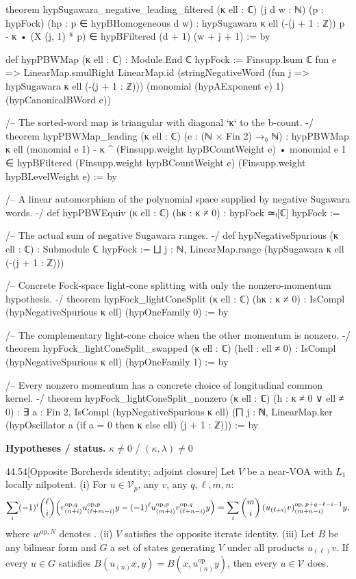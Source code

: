 \documentclass[11pt,openany]{book}
\theoremstyle{definition}
\theoremstyle{plain}
\begin{document}
\begin{leancode}
theorem hypSugawara_negative_leading_filtered (κ ell : ℂ) (j d w : ℕ)
    (p : hypFock) (hp : p ∈ hypBHomogeneous d w) :
    hypSugawara κ ell (-(j + 1 : ℤ)) p - κ • (X (j, 1) * p) ∈
      hypBFiltered (d + 1) (w + j + 1) := by

def hypPBWMap (κ ell : ℂ) : Module.End ℂ hypFock :=
  Finsupp.lsum ℂ fun e => LinearMap.smulRight LinearMap.id
    (stringNegativeWord (fun j => hypSugawara κ ell (-(j + 1 : ℤ)))
      (monomial (hypAExponent e) 1) (hypCanonicalBWord e))

/-- The sorted-word map is triangular with diagonal `κ` to the b-count. -/
theorem hypPBWMap_leading (κ ell : ℂ) (e : (ℕ × Fin 2) →₀ ℕ) :
    hypPBWMap κ ell (monomial e 1) -
      κ ^ (Finsupp.weight hypBCountWeight e) • monomial e 1 ∈
      hypBFiltered (Finsupp.weight hypBCountWeight e) (Finsupp.weight hypBLevelWeight e) := by

/-- A linear automorphism of the polynomial space supplied by negative Sugawara words. -/
def hypPBWEquiv (κ ell : ℂ) (hκ : κ ≠ 0) : hypFock ≃ₗ[ℂ] hypFock :=

/-- The actual sum of negative Sugawara ranges. -/
def hypNegativeSpurious (κ ell : ℂ) : Submodule ℂ hypFock :=
  ⨆ j : ℕ, LinearMap.range (hypSugawara κ ell (-(j + 1 : ℤ)))

/-- Concrete Fock-space light-cone splitting with only the nonzero-momentum hypothesis. -/
theorem hypFock_lightConeSplit (κ ell : ℂ) (hκ : κ ≠ 0) :
    IsCompl (hypNegativeSpurious κ ell) (hypOneFamily 0) := by

/-- The complementary light-cone choice when the other momentum is nonzero. -/
theorem hypFock_lightConeSplit_swapped (κ ell : ℂ) (hell : ell ≠ 0) :
    IsCompl (hypNegativeSpurious κ ell) (hypOneFamily 1) := by

/-- Every nonzero momentum has a concrete choice of longitudinal common kernel. -/
theorem hypFock_lightConeSplit_nonzero (κ ell : ℂ) (h : κ ≠ 0 ∨ ell ≠ 0) :
    ∃ a : Fin 2, IsCompl (hypNegativeSpurious κ ell)
      (⨅ j : ℕ, LinearMap.ker (hypOscillator a (if a = 0 then κ else ell) (j + 1 : ℤ))) := by
\end{leancode}
\noindent\textbf{Hypotheses / status.} $\kappa\ne0$ / $(\kappa,\lambda)\ne0$\par
\medskip
\begin{btheorem}{44.54}[Opposite Borcherds identity; adjoint closure]
Let $V$ be a near-VOA with $L_1$ locally nilpotent.  (i) For $u\in\mathcal V_p$, any $v$, any $q,\ell,m,n$:
\begin{multline*}
\sum_i(-1)^i\binom\ell i\Bigl(v^{\mathrm{op},q}_{(n+i)}u^{\mathrm{op},p}_{(\ell+m-i)}y-(-1)^\ell u^{\mathrm{op},p}_{(m+i)}v^{\mathrm{op},q}_{(\ell+n-i)}y\Bigr)
=\sum_i\binom mi\,(u_{(\ell+i)}v)^{\mathrm{op},\,p+q-\ell-i-1}_{(m+n-i)}y,
\end{multline*}
where $w^{\mathrm{op},N}$ denotes .  (ii) $V$ satisfies the opposite iterate identity.
(iii) Let $B$ be any bilinear form and $G$ a set of states generating $V$ under all products $u_{(\ell)}v$.  If every $u\in G$
satisfies $B(u_{(n)}x,y)=B(x,u^{\mathrm{op}}_{(n)}y)$, then every $u\in\mathcal V$ does.
\end{btheorem}
\end{document}
